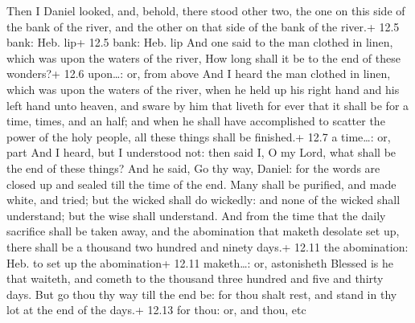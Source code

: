  Then I Daniel looked, and, behold, there stood other two,
the one on this side of the bank of the river, and the other on that
side of the bank of the river.+ 12.5 bank: Heb. lip+ 12.5 bank: Heb. lip
 And one said to the man clothed in linen, which was upon
the waters of the river, How long shall it be to the end of these
wonders?+ 12.6 upon\ldots: or, from above  And I heard the
man clothed in linen, which was upon the waters of the river, when he
held up his right hand and his left hand unto heaven, and sware by him
that liveth for ever that it shall be for a time, times, and an half;
and when he shall have accomplished to scatter the power of the holy
people, all these things shall be finished.+ 12.7 a time\ldots: or, part
 And I heard, but I understood not: then said I, O my
Lord, what shall be the end of these things?  And he said,
Go thy way, Daniel: for the words are closed up and sealed till the time
of the end.  Many shall be purified, and made white, and
tried; but the wicked shall do wickedly: and none of the wicked shall
understand; but the wise shall understand.  And from the
time that the daily sacrifice shall be taken away, and the abomination
that maketh desolate set up, there shall be a thousand two hundred and
ninety days.+ 12.11 the abomination: Heb. to set up the abomination+
12.11 maketh\ldots: or, astonisheth  Blessed is he that
waiteth, and cometh to the thousand three hundred and five and thirty
days.  But go thou thy way till the end be: for thou
shalt rest, and stand in thy lot at the end of the days.+ 12.13 for
thou: or, and thou, etc
